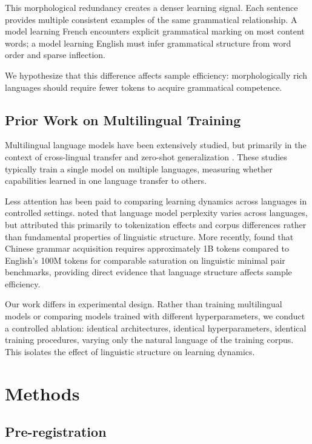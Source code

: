 \documentclass[11pt,a4paper]{article}
\begin{document}
This morphological redundancy creates a denser learning signal. Each sentence provides multiple consistent examples of the same grammatical relationship. A model learning French encounters explicit grammatical marking on most content words; a model learning English must infer grammatical structure from word order and sparse inflection.

We hypothesize that this difference affects sample efficiency: morphologically rich languages should require fewer tokens to acquire grammatical competence.

\subsection{Prior Work on Multilingual Training}

Multilingual language models have been extensively studied, but primarily in the context of cross-lingual transfer and zero-shot generalization \citep{conneau2020unsupervised,xue2021mt5}. These studies typically train a single model on multiple languages, measuring whether capabilities learned in one language transfer to others.

Less attention has been paid to comparing learning dynamics across languages in controlled settings. \citet{gerz2018relation} noted that language model perplexity varies across languages, but attributed this primarily to tokenization effects and corpus differences rather than fundamental properties of linguistic structure. More recently, \citet{liu2024zhoblimp} found that Chinese grammar acquisition requires approximately 1B tokens compared to English's 100M tokens for comparable saturation on linguistic minimal pair benchmarks, providing direct evidence that language structure affects sample efficiency.

Our work differs in experimental design. Rather than training multilingual models or comparing models trained with different hyperparameters, we conduct a controlled ablation: identical architectures, identical hyperparameters, identical training procedures, varying only the natural language of the training corpus. This isolates the effect of linguistic structure on learning dynamics.

\section{Methods}

\subsection{Pre-registration}
\end{document}
